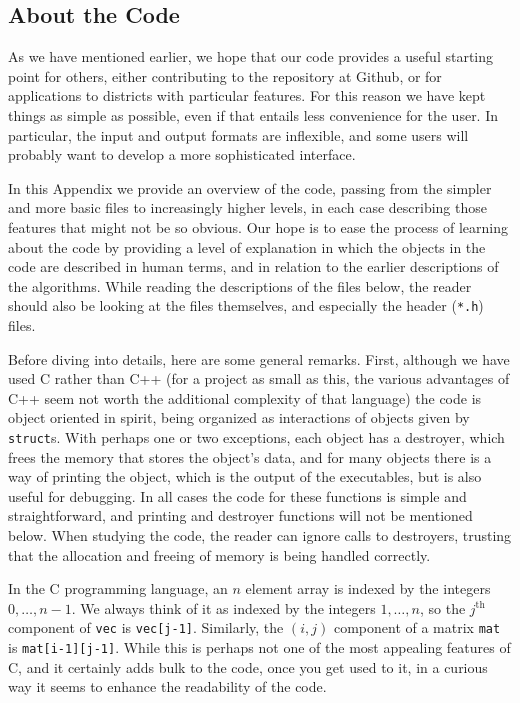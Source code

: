 \documentclass[12pt]{article}
\theoremstyle{definition}
\begin{document}
\begin{appendix}

\section{About the Code} \label{app:Code}

As we have mentioned earlier, we hope that our code provides a useful
starting point for others, either contributing to the repository at
Github, or for applications to districts with particular features.
For this reason we have kept things as simple as possible, even if
that entails less convenience for the user.  In particular, the input
and output formats are inflexible, and some users will probably want
to develop a more sophisticated interface.

In this Appendix we provide an overview of the code, passing from the
simpler and more basic files to increasingly higher levels, in each
case describing those features that might not be so obvious.  Our hope
is to ease the process of learning about the code by providing a level
of explanation in which the objects in the code are described in human
terms, and in relation to the earlier descriptions of the algorithms.
While reading the descriptions of the files below, the reader should
also be looking at the files themselves, and especially the header
(\texttt{*.h}) files.

Before diving into details, here are some general remarks.  First,
although we have used C rather than C++ (for a project as small as
this, the various advantages of C++ seem not worth the additional
complexity of that language) the code is object oriented in spirit,
being organized as interactions of objects given by \texttt{struct}s.
With perhaps one or two exceptions, each object has a destroyer, which
frees the memory that stores the object's data, and for many objects
there is a way of printing the object, which is the output of the
executables, but is also useful for debugging.  In all cases the code
for these functions is simple and straightforward, and printing and
destroyer functions will not be mentioned below.  When studying the
code, the reader can ignore calls to destroyers, trusting that the
allocation and freeing of memory is being handled correctly.

In the C programming language, an $n$ element array is indexed by the
integers $0, \ldots, n-1$.  We always think of it as indexed by the
integers $1, \ldots, n$, so the $j^{\text{th}}$ component of
\texttt{vec} is \texttt{vec[j-1]}.  Similarly, the $(i,j)$ component
of a matrix \texttt{mat} is \texttt{mat[i-1][j-1]}.  While this is
perhaps not one of the most appealing features of C, and it certainly
adds bulk to the code, once you get used to it, in a curious way it
seems to enhance the readability of the code.


\end{appendix}
\end{document}
